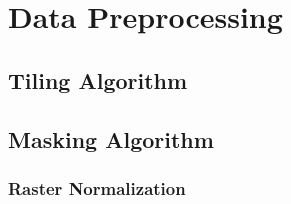 \section{Data Preprocessing}



\subsection{Tiling Algorithm}


\subsection{Masking Algorithm}
\label{sec:masking}


\subsubsection{Raster Normalization}
\label{sec:raster-normalization}

